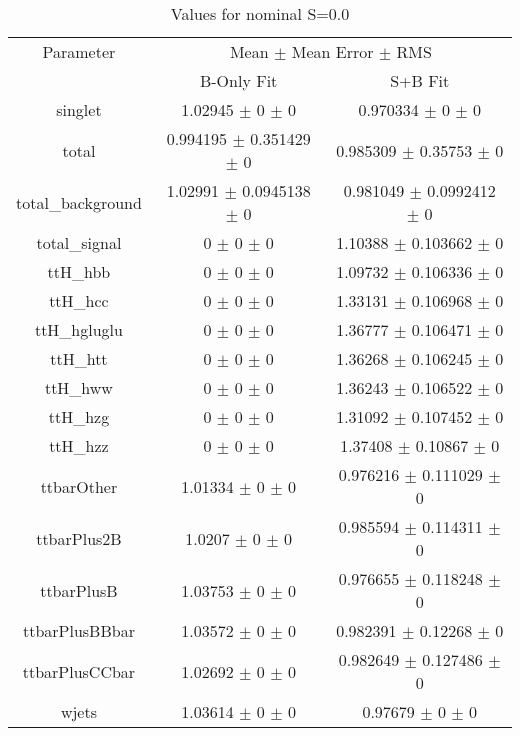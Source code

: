 \begin{table}
\centering
\caption{Values for nominal S=0.0}
\begin{tabular}{ccc}
\toprule
Parameter & \multicolumn{2}{c}{Mean $\pm$ Mean Error $\pm$ RMS}\\
 & B-Only Fit & S+B Fit\\
\midrule
singlet & \num{1.02945} $\pm$ \num{0} $\pm$ \num{0} & \num{0.970334} $\pm$ \num{0} $\pm$ \num{0}\\
total & \num{0.994195} $\pm$ \num{0.351429} $\pm$ \num{0} & \num{0.985309} $\pm$ \num{0.35753} $\pm$ \num{0}\\
total\_background & \num{1.02991} $\pm$ \num{0.0945138} $\pm$ \num{0} & \num{0.981049} $\pm$ \num{0.0992412} $\pm$ \num{0}\\
total\_signal & \num{0} $\pm$ \num{0} $\pm$ \num{0} & \num{1.10388} $\pm$ \num{0.103662} $\pm$ \num{0}\\
ttH\_hbb & \num{0} $\pm$ \num{0} $\pm$ \num{0} & \num{1.09732} $\pm$ \num{0.106336} $\pm$ \num{0}\\
ttH\_hcc & \num{0} $\pm$ \num{0} $\pm$ \num{0} & \num{1.33131} $\pm$ \num{0.106968} $\pm$ \num{0}\\
ttH\_hgluglu & \num{0} $\pm$ \num{0} $\pm$ \num{0} & \num{1.36777} $\pm$ \num{0.106471} $\pm$ \num{0}\\
ttH\_htt & \num{0} $\pm$ \num{0} $\pm$ \num{0} & \num{1.36268} $\pm$ \num{0.106245} $\pm$ \num{0}\\
ttH\_hww & \num{0} $\pm$ \num{0} $\pm$ \num{0} & \num{1.36243} $\pm$ \num{0.106522} $\pm$ \num{0}\\
ttH\_hzg & \num{0} $\pm$ \num{0} $\pm$ \num{0} & \num{1.31092} $\pm$ \num{0.107452} $\pm$ \num{0}\\
ttH\_hzz & \num{0} $\pm$ \num{0} $\pm$ \num{0} & \num{1.37408} $\pm$ \num{0.10867} $\pm$ \num{0}\\
ttbarOther & \num{1.01334} $\pm$ \num{0} $\pm$ \num{0} & \num{0.976216} $\pm$ \num{0.111029} $\pm$ \num{0}\\
ttbarPlus2B & \num{1.0207} $\pm$ \num{0} $\pm$ \num{0} & \num{0.985594} $\pm$ \num{0.114311} $\pm$ \num{0}\\
ttbarPlusB & \num{1.03753} $\pm$ \num{0} $\pm$ \num{0} & \num{0.976655} $\pm$ \num{0.118248} $\pm$ \num{0}\\
ttbarPlusBBbar & \num{1.03572} $\pm$ \num{0} $\pm$ \num{0} & \num{0.982391} $\pm$ \num{0.12268} $\pm$ \num{0}\\
ttbarPlusCCbar & \num{1.02692} $\pm$ \num{0} $\pm$ \num{0} & \num{0.982649} $\pm$ \num{0.127486} $\pm$ \num{0}\\
wjets & \num{1.03614} $\pm$ \num{0} $\pm$ \num{0} & \num{0.97679} $\pm$ \num{0} $\pm$ \num{0}\\
\bottomrule
\end{tabular}
\end{table}